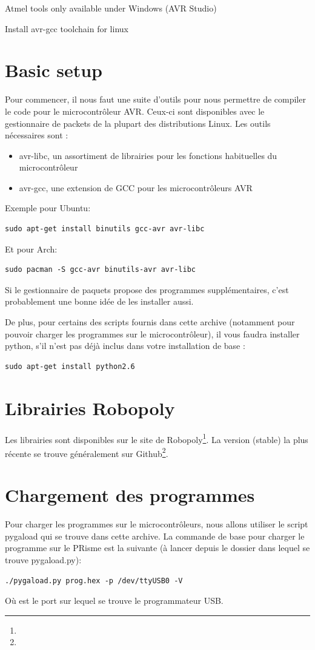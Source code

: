 Atmel tools only available under Windows (AVR Studio)

Install avr-gcc toolchain for linux

\section{Basic setup}
Pour commencer, il nous faut une suite d'outils pour nous permettre de compiler
le code pour le microcontrôleur AVR. Ceux-ci sont disponibles avec le
gestionnaire de packets de la plupart des distributions Linux.
Les outils nécessaires sont :
\begin{itemize}
  \item avr-libc, un assortiment de librairies pour les fonctions habituelles du
    microcontrôleur
  \item avr-gcc, une extension de GCC pour les microcontrôleurs AVR
\end{itemize}

Exemple pour Ubuntu:
\begin{lstlisting}[style=console]
  sudo apt-get install binutils gcc-avr avr-libc
\end{lstlisting}
Et pour Arch:
\begin{lstlisting}[style=console]
  sudo pacman -S gcc-avr binutils-avr avr-libc
\end{lstlisting}
Si le gestionnaire de paquets propose des programmes supplémentaires, c'est
probablement une bonne idée de les installer aussi.

De plus, pour certains des scripts fournis dans cette archive (notamment pour
pouvoir charger les programmes sur le microcontrôleur), il vous faudra installer
python, s'il n'est pas déjà inclus dans votre installation de base :

\begin{lstlisting}[style=console]
  sudo apt-get install python2.6
\end{lstlisting}

\section{Librairies Robopoly}
Les librairies sont disponibles sur le site de
Robopoly\footnote{\urlrobopoly{}}. La version
(stable) la plus récente se trouve généralement sur
Github\footnote{\urldownloads{}}.

\section{Chargement des programmes}
Pour charger les programmes sur le microcontrôleurs, nous allons utiliser le
script pygaload qui se trouve dans cette archive. La commande de base pour
charger le programme  sur le PRisme est la suivante (à lancer depuis
le dossier dans lequel se trouve pygaload.py):
\begin{lstlisting}[style=console]
  ./pygaload.py prog.hex -p /dev/ttyUSB0 -V
\end{lstlisting}
Où  est le port sur lequel se trouve le programmateur USB.

